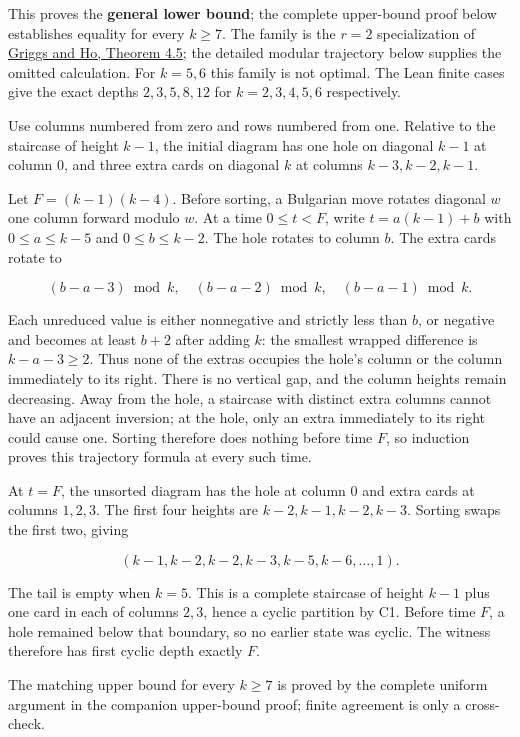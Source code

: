 \documentclass[11pt,a4paper]{article}
\begin{document}
This proves the \textbf{general lower bound}; the complete upper-bound proof below establishes equality for every $k\ge7$. The family is the $r=2$ specialization of \href{https://sc.edu/study/colleges_schools/artsandsciences/mathematics/research/imi/research/documents/1998/1998_12.pdf}{Griggs and Ho, Theorem 4.5}; the detailed modular trajectory below supplies the omitted calculation. For $k=5,6$ this family is not optimal. The Lean finite cases give the exact depths $2,3,5,8,12$ for $k=2,3,4,5,6$ respectively.

Use columns numbered from zero and rows numbered from one. Relative to the staircase of height $k-1$, the initial diagram has one hole on diagonal $k-1$ at column $0$, and three extra cards on diagonal $k$ at columns $k-3,k-2,k-1$.

Let $F=(k-1)(k-4)$. Before sorting, a Bulgarian move rotates diagonal $w$ one column forward modulo $w$. At a time $0\le t<F$, write $t=a(k-1)+b$ with $0\le a\le k-5$ and $0\le b\le k-2$. The hole rotates to column $b$. The extra cards rotate to

\[
(b-a-3)\bmod k,\quad(b-a-2)\bmod k,\quad(b-a-1)\bmod k.
\]

Each unreduced value is either nonnegative and strictly less than $b$, or negative and becomes at least $b+2$ after adding $k$: the smallest wrapped difference is $k-a-3\ge2$. Thus none of the extras occupies the hole's column or the column immediately to its right. There is no vertical gap, and the column heights remain decreasing. Away from the hole, a staircase with distinct extra columns cannot have an adjacent inversion; at the hole, only an extra immediately to its right could cause one. Sorting therefore does nothing before time $F$, so induction proves this trajectory formula at every such time.

At $t=F$, the unsorted diagram has the hole at column $0$ and extra cards at columns $1,2,3$. The first four heights are $k-2,k-1,k-2,k-3$. Sorting swaps the first two, giving

\[
(k-1,k-2,k-2,k-3,k-5,k-6,\ldots,1).
\]

The tail is empty when $k=5$. This is a complete staircase of height $k-1$ plus one card in each of columns $2,3$, hence a cyclic partition by C1. Before time $F$, a hole remained below that boundary, so no earlier state was cyclic. The witness therefore has first cyclic depth exactly $F$.

The matching upper bound for every $k\ge7$ is proved by the complete uniform argument in the companion upper-bound proof; finite agreement is only a cross-check.
\end{document}
